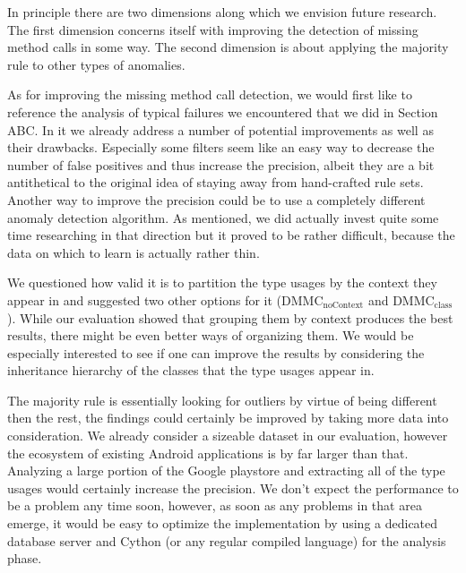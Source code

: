 In principle there are two dimensions along which we envision future research.
The first dimension concerns itself with improving the detection of missing method calls in some way.
The second dimension is about applying the majority rule to other types of anomalies.

As for improving the missing method call detection, we would first like to reference the analysis of typical failures we encountered that we did in Section ABC.
In it we already address a number of potential improvements as well as their drawbacks.
Especially some filters seem like an easy way to decrease the number of false positives and thus increase the precision, albeit they are a bit antithetical to the original idea of staying away from hand-crafted rule sets.
Another way to improve the precision could be to use a completely different anomaly detection algorithm.
As mentioned, we did actually invest quite some time researching in that direction but it proved to be rather difficult, because the data on which to learn is actually rather thin.

We questioned how valid it is to partition the type usages by the context they appear in and suggested two other options for it ($\text{DMMC}_\text{noContext}$ and $\text{DMMC}_\text{class}$).
While our evaluation showed that grouping them by context produces the best results, there might be even better ways of organizing them.
We would be especially interested to see if one can improve the results by considering the inheritance hierarchy of the classes that the type usages appear in.

The majority rule is essentially looking for outliers by virtue of being different then the rest, the findings could certainly be improved by taking more data into consideration.
We already consider a sizeable dataset in our evaluation, however the ecosystem of existing Android applications is by far larger than that.
Analyzing a large portion of the Google playstore and extracting all of the type usages would certainly increase the precision.
We don't expect the performance to be a problem any time soon, however, as soon as any problems in that area emerge, it would be easy to optimize the implementation by using a dedicated database server and Cython (or any regular compiled language) for the analysis phase.

